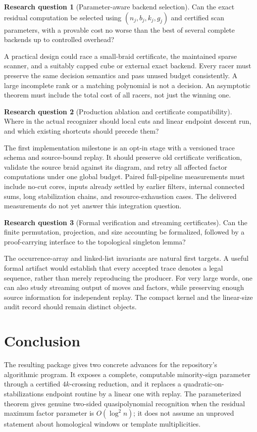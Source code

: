 \documentclass[11pt,letterpaper]{article}
\theoremstyle{definition}
\newtheorem{question}{Research question}[section]
\begin{document}
\begin{question}[Parameter-aware backend selection]
Can the exact residual computation be selected using $(n_j,b_j,k_j,g_j)$ and certified scan parameters, with a provable cost no worse than the best of several complete backends up to controlled overhead?
\end{question}
A practical design could race a small-braid certificate, the maintained sparse scanner, and a suitably capped cube or external exact backend. Every racer must preserve the same decision semantics and pass unused budget consistently. A large incomplete rank or a matching polynomial is not a decision. An asymptotic theorem must include the total cost of all racers, not just the winning one.

\begin{question}[Production ablation and certificate compatibility]
Where in the actual recognizer should local cuts and linear endpoint descent run, and which existing shortcuts should precede them?
\end{question}
The first implementation milestone is an opt-in stage with a versioned trace schema and source-bound replay. It should preserve old certificate verification, validate the source braid against its diagram, and retry all affected factor computations under one global budget. Paired full-pipeline measurements must include no-cut cores, inputs already settled by earlier filters, internal connected sums, long stabilization chains, and resource-exhaustion cases. The delivered measurements do not yet answer this integration question.

\begin{question}[Formal verification and streaming certificates]
Can the finite permutation, projection, and size accounting be formalized, followed by a proof-carrying interface to the topological singleton lemma?
\end{question}
The occurrence-array and linked-list invariants are natural first targets. A useful formal artifact would establish that every accepted trace denotes a legal sequence, rather than merely reproducing the producer. For very large words, one can also study streaming output of moves and factors, while preserving enough source information for independent replay. The compact kernel and the linear-size audit record should remain distinct objects.

\section{Conclusion}
The resulting package gives two concrete advances for the repository's algorithmic program. It exposes a complete, computable minority-sign parameter through a certified $4k$-crossing reduction, and it replaces a quadratic-on-stabilizations endpoint routine by a linear one with replay. The parameterized theorem gives genuine two-sided quasipolynomial recognition when the residual maximum factor parameter is $O(\log^2 n)$; it does not assume an unproved statement about homological windows or template multiplicities.
\end{document}
